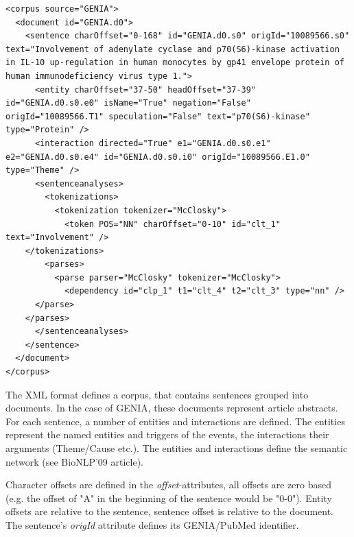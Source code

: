 \documentclass[a4paper,12pt]{article}
\begin{document}

\begin{lstlisting}
<corpus source="GENIA">
  <document id="GENIA.d0">
    <sentence charOffset="0-168" id="GENIA.d0.s0" origId="10089566.s0" text="Involvement of adenylate cyclase and p70(S6)-kinase activation in IL-10 up-regulation in human monocytes by gp41 envelope protein of human immunodeficiency virus type 1.">
      <entity charOffset="37-50" headOffset="37-39" id="GENIA.d0.s0.e0" isName="True" negation="False" origId="10089566.T1" speculation="False" text="p70(S6)-kinase" type="Protein" />
      <interaction directed="True" e1="GENIA.d0.s0.e1" e2="GENIA.d0.s0.e4" id="GENIA.d0.s0.i0" origId="10089566.E1.0" type="Theme" />
      <sentenceanalyses>
        <tokenizations>
          <tokenization tokenizer="McClosky">
            <token POS="NN" charOffset="0-10" id="clt_1" text="Involvement" />
 	</tokenizations>
        <parses>
          <parse parser="McClosky" tokenizer="McClosky">
            <dependency id="clp_1" t1="clt_4" t2="clt_3" type="nn" />
	  </parse>
	</parses>
      </sentenceanalyses>
    </sentence>
  </document>
</corpus>
\end{lstlisting}

The XML format defines a corpus, that contains sentences grouped into documents.
In the case of GENIA, these documents represent article abstracts. For each
sentence, a number of entities and interactions are defined. The entities
represent the named entities and triggers of the events, the interactions their
arguments (Theme/Cause etc.). The entities and interactions define the semantic
network (see BioNLP'09 article).

Character offsets are defined in the \emph{offset}-attributes, all offsets are
zero based (e.g. the offset of "A" in the beginning of the sentence would be "0-0").
Entity offsets are relative to the sentence, sentence offset is relative to the
document. The sentence's \emph{origId} attribute defines its GENIA/PubMed
identifier.
\end{document}
